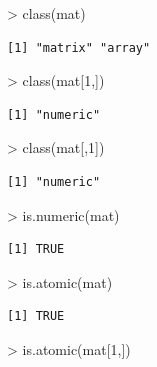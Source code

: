 \documentclass[
]{book}
\newenvironment{Shaded}{\begin{snugshade}}{\end{snugshade}}
\newcommand{\DecValTok}[1]{\textcolor[rgb]{0.00,0.00,0.81}{#1}}
\newcommand{\FunctionTok}[1]{\textcolor[rgb]{0.00,0.00,0.00}{#1}}
\newcommand{\NormalTok}[1]{#1}
\newcommand{\SpecialCharTok}[1]{\textcolor[rgb]{0.00,0.00,0.00}{#1}}
\theoremstyle{definition}
\theoremstyle{definition}
\theoremstyle{definition}
\theoremstyle{definition}
\theoremstyle{remark}
\begin{document}
\begin{Shaded}
\begin{Highlighting}[]
\SpecialCharTok{\textgreater{}} \FunctionTok{class}\NormalTok{(mat)}
\end{Highlighting}
\end{Shaded}

\begin{verbatim}
[1] "matrix" "array" 
\end{verbatim}

\begin{Shaded}
\begin{Highlighting}[]
\SpecialCharTok{\textgreater{}} \FunctionTok{class}\NormalTok{(mat[}\DecValTok{1}\NormalTok{,])}
\end{Highlighting}
\end{Shaded}

\begin{verbatim}
[1] "numeric"
\end{verbatim}

\begin{Shaded}
\begin{Highlighting}[]
\SpecialCharTok{\textgreater{}} \FunctionTok{class}\NormalTok{(mat[,}\DecValTok{1}\NormalTok{])}
\end{Highlighting}
\end{Shaded}

\begin{verbatim}
[1] "numeric"
\end{verbatim}

\begin{Shaded}
\begin{Highlighting}[]
\SpecialCharTok{\textgreater{}} \FunctionTok{is.numeric}\NormalTok{(mat)}
\end{Highlighting}
\end{Shaded}

\begin{verbatim}
[1] TRUE
\end{verbatim}

\begin{Shaded}
\begin{Highlighting}[]
\SpecialCharTok{\textgreater{}} \FunctionTok{is.atomic}\NormalTok{(mat)}
\end{Highlighting}
\end{Shaded}

\begin{verbatim}
[1] TRUE
\end{verbatim}

\begin{Shaded}
\begin{Highlighting}[]
\SpecialCharTok{\textgreater{}} \FunctionTok{is.atomic}\NormalTok{(mat[}\DecValTok{1}\NormalTok{,])}
\end{Highlighting}
\end{Shaded}
\end{document}
